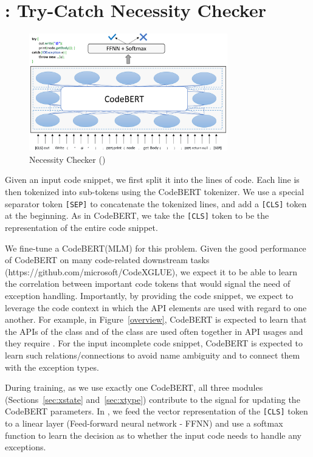 \section{{\xblock}: Try-Catch Necessity Checker}
\label{xblock:sec}

\begin{figure}[t]
 	\centering
 	\includegraphics[width=3.4in]{xblock-3.png}
        \vspace{-20pt}
 	\caption{ Necessity Checker ({\xblock})}
 	\label{fig:gcn}	
\end{figure}

Given an input code snippet, we first split it into the lines of
code. Each line is then tokenized into sub-tokens using the CodeBERT
tokenizer. We use a special separator token \texttt{[SEP]} to
concatenate the tokenized lines, and add a \texttt{[CLS]} token at the
beginning. As in CodeBERT, we take the \texttt{[CLS]} token to be the
representation of the entire code snippet.

We fine-tune a CodeBERT(MLM) for this problem.  Given the good
performance of CodeBERT on many code-related downstream tasks
(https://github.com/microsoft/CodeXGLUE), we expect it to be able to
learn the correlation between important code tokens that would signal
the need of exception handling. Importantly, by providing the code
snippet, we expect to leverage the code context in which the API
elements are used with regard to one another. For example, in
Figure~\ref{overview}, CodeBERT is expected to learn that the APIs
 of the class  and 
of the class  are used often together in API
usages and they require . For the input incomplete
code snippet, CodeBERT is expected to learn such relations/connections
to avoid name ambiguity and to connect them with the exception types.


During training, as we use exactly one CodeBERT, all three modules
(Sections~\ref{sec:xstate} and~\ref{sec:xtype}) contribute
to the signal for updating the CodeBERT parameters. In {\xblock}, we
feed the vector representation of the \texttt{[CLS]} token to a linear
layer (Feed-forward neural network - FFNN) and use a softmax function
to learn the decision as to whether the input code needs to handle any
exceptions.

